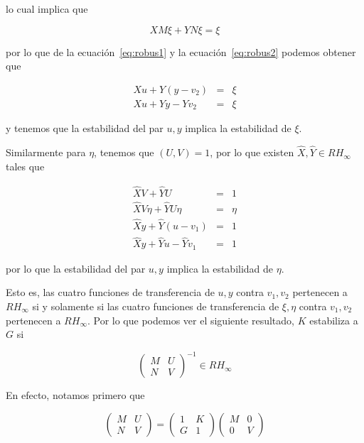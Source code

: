         lo cual implica que

        \begin{equation} \label{eq:robus2}
            X M \xi + Y N \xi = \xi
        \end{equation}

        por lo que de la ecuación~\ref{eq:robus1} y la ecuación~\ref{eq:robus2} podemos obtener que

        \begin{eqnarray}
            X u + Y (y - v_2) & = & \xi \nonumber \\
            X u + Y y - Y v_2 & = & \xi
        \end{eqnarray}

        y tenemos que la estabilidad del par $u, y$ implica la estabilidad de $\xi$.

        Similarmente para $\eta$, tenemos que $(U, V) = 1$, por lo que existen $\hat{X}, \hat{Y} \in RH_{\infty}$ tales que

        \begin{eqnarray}
            \hat{X} V + \hat{Y} U & = & 1 \nonumber \\
            \hat{X} V \eta + \hat{Y} U \eta & = & \eta \nonumber \\
            \hat{X} y + \hat{Y} (u - v_1) & = & 1 \nonumber \\
            \hat{X} y + \hat{Y} u - \hat{Y} v_1 & = & 1
        \end{eqnarray}

        por lo que la estabilidad del par $u, y$ implica la estabilidad de $\eta$.

        Esto es, las cuatro funciones de transferencia de $u, y$ contra $v_1, v_2$ pertenecen a $RH_{\infty}$ si y solamente si las cuatro funciones de transferencia de $\xi, \eta$ contra $v_1, v_2$ pertenecen a $RH_{\infty}$.
        Por lo que podemos ver el siguiente resultado, $K$ estabiliza a $G$ si

        \begin{equation}
            \begin{pmatrix}
                M & U \\
                N & V
            \end{pmatrix}^{-1} \in RH_{\infty}
        \end{equation}

        En efecto, notamos primero que

        \begin{equation*}
            \begin{pmatrix}
                M & U \\
                N & V
            \end{pmatrix} =
            \begin{pmatrix}
                1 & K \\
                G & 1
            \end{pmatrix}
            \begin{pmatrix}
                M & 0 \\
                0 & V
            \end{pmatrix}
        \end{equation*}

